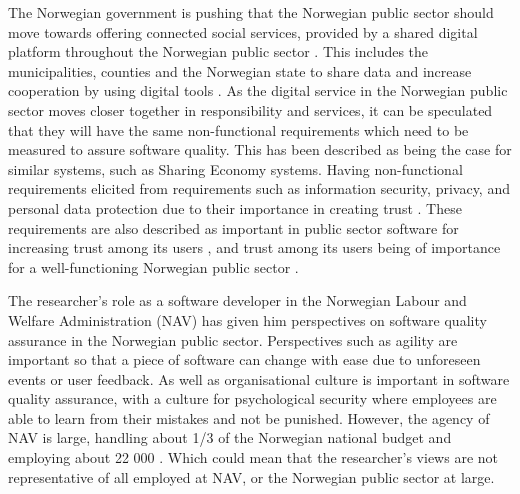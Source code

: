 The Norwegian government is pushing that the Norwegian public sector should move towards offering connected social services, provided by a shared digital platform throughout the Norwegian public sector \cite{r_2019}. This includes the municipalities, counties and the Norwegian state to share data and increase cooperation by using digital tools \cite{r_2019}. As the digital service in the Norwegian public sector moves closer together in responsibility and services, it can be speculated that they will have the same non-functional requirements which need to be measured to assure software quality. This has been described as being the case for similar systems, such as Sharing Economy systems. Having non-functional requirements elicited from requirements such as information security, privacy, and personal data protection due to their importance in creating trust \cite{is_2019}. These requirements are also described as important in public sector software for increasing trust among its users \cite{la_2017}, and trust among its users being of importance for a well-functioning Norwegian public sector \cite{oecd_2022}.


The researcher's role as a software developer in the Norwegian Labour and Welfare Administration (NAV) has given him perspectives on software quality assurance in the Norwegian public sector. Perspectives such as agility are important so that a piece of software can change with ease due to unforeseen events or user feedback. As well as organisational culture is important in software quality assurance, with a culture for psychological security where employees are able to learn from their mistakes and not be punished. However, the agency of NAV is large, handling about 1/3 of the Norwegian national budget \cite{okp_nav_r_2022}\cite{bud_r_2021} and employing about 22 000 \cite{org_nav_2023}. Which could mean that the researcher's views are not representative of all employed at NAV, or the Norwegian public sector at large.


